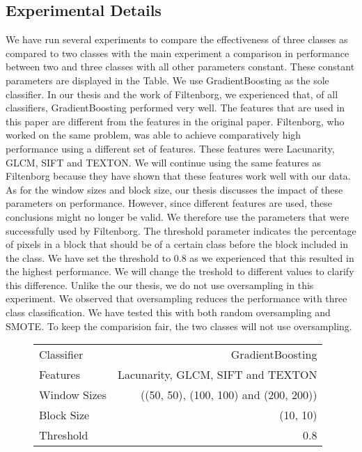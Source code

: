 \subsection{Experimental Details}
We have run several experiments to compare the effectiveness of three classes as compared to two classes with the main experiment a comparison in performance between two and three classes with all other parameters constant. These constant parameters are displayed in the Table. We use GradientBoosting as the sole classifier. In our thesis and the work of Filtenborg, we experienced that, of all classifiers, GradientBoosting performed very well.
The features that are used in this paper are different from the features in the original paper. Filtenborg, who worked on the same problem, was able to achieve comparatively high performance using a different set of features. These features were Lacunarity, GLCM, SIFT and TEXTON. We will continue using the same features as Filtenborg because they have shown that these features work well with our data.
As for the window sizes and block size, our thesis discusses the impact of these parameters on performance. However, since different features are used, these conclusions might no longer be valid. We therefore use the parameters that were successfully used by Filtenborg.
The threshold parameter indicates the percentage of pixels in a block that should be of a certain class before the block included in the class. We have set the threshold to 0.8 as we experienced that this resulted in the highest performance. We will change the treshold to different values to clarify this difference.
Unlike the our thesis, we do not use oversampling in this experiment. We observed that oversampling reduces the performance with three class classification. We have tested this with both random oversampling and SMOTE. To keep the comparision fair, the two classes will not use oversampling.


\begin{figure}
	\centering
	\begin{tabular}{lr}
		Classifier & GradientBoosting\\
		Features & Lacunarity, GLCM, SIFT and TEXTON\\
		Window Sizes & ((50, 50), (100, 100) and (200, 200))\\
		Block Size & (10, 10)\\
		Threshold & 0.8
	\end{tabular}
	\label{tab:params}
\end{figure}
